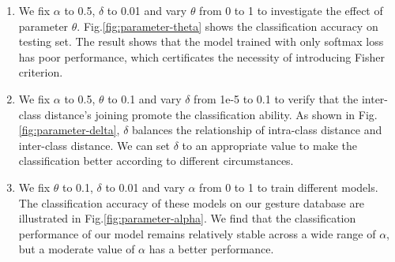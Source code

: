 \documentclass[review]{elsarticle}
\begin{document}
\begin{enumerate}
	\item We fix $\alpha$ to 0.5, $\delta$ to 0.01 and vary $\theta$ from 0 to 1 to investigate the effect of parameter $\theta$. Fig.\;\ref{fig:parameter-theta} shows the classification accuracy on testing set. The result shows that the model trained with only softmax loss has poor performance, which certificates the necessity of introducing Fisher criterion.
	\item We fix $\alpha$ to 0.5, $\theta$ to 0.1 and vary $\delta$ from 1e-5 to 0.1 to verify that the inter-class distance’s joining promote the classification ability. As shown in Fig.\;\ref{fig:parameter-delta}, $\delta$  balances the relationship of intra-class distance and inter-class distance. We can set $\delta$ to an appropriate value to make the classification better according to different circumstances.
	\item We fix $\theta$ to 0.1, $\delta$ to 0.01 and vary $\alpha$ from 0 to 1 to train different models. The classification accuracy of these models on our gesture database are illustrated in Fig.\;\ref{fig:parameter-alpha}. We find that the classification performance of our model remains relatively stable across a wide range of $\alpha$, but a moderate value of $\alpha$ has a better performance.
\end{enumerate}
\end{document}

